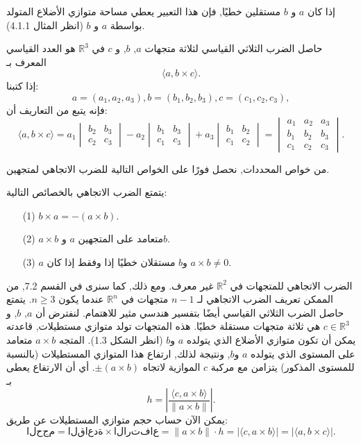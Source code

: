 إذا كان \( a \) و \( b \) مستقلين خطيًا, فإن هذا التعبير يعطي مساحة متوازي الأضلاع المتولد بواسطة \( a \) و \( b \) (انظر المثال 4.1.1).
\begin{definition}
حاصل الضرب الثلاثي القياسي لثلاثة متجهات \( a \), \( b \), و \( c \) في \( \mathbb{R}^3 \) هو العدد القياسي المعرف بـ
\[ \langle a, b \times c \rangle. \]
إذا كتبنا:
\[ a = (a_1, a_2, a_3), b = (b_1, b_2, b_3), c = (c_1, c_2, c_3), \]
فإنه يتبع من التعاريف أن:
\[ \langle a, b \times c \rangle = a_1 \begin{vmatrix} b_2 & b_3 \\ c_2 & c_3 \end{vmatrix} - a_2 \begin{vmatrix} b_1 & b_3 \\ c_1 & c_3 \end{vmatrix} + a_3 \begin{vmatrix} b_1 & b_2 \\ c_1 & c_2 \end{vmatrix} = \begin{vmatrix} a_1 & a_2 & a_3 \\ b_1 & b_2 & b_3 \\ c_1 & c_2 & c_3 \end{vmatrix}. \]
\end{definition}
من خواص المحددات, نحصل فورًا على الخواص التالية للضرب الاتجاهي لمتجهين.

\begin{theoreme}
يتمتع الضرب الاتجاهي بالخصائص التالية:
\begin{itemize}
    \item [(1)] \( b \times a = - (a \times b) \).
    \item [(2)] \( a \times b \) متعامد على المتجهين \( a \) و\( b \).
    \item [(3)] \( a \) و\( b \) مستقلان خطيًا إذا وفقط إذا كان \( a \times b \neq 0 \).
\end{itemize}
\end{theoreme}

الضرب الاتجاهي للمتجهات في \( \mathbb{R}^2 \) غير معرف. ومع ذلك, كما سنرى في القسم 7.2, من الممكن تعريف الضرب الاتجاهي لـ \( n - 1 \) متجهات في \( \mathbb{R}^n \) عندما يكون \( n \geq 3 \).
يتمتع حاصل الضرب الثلاثي القياسي أيضًا بتفسير هندسي مثير للاهتمام. لنفترض أن \( a \), \( b \), و\( c \in \mathbb{R}^3 \) هي ثلاثة متجهات مستقلة خطيًا. هذه المتجهات تولد متوازي مستطيلات, قاعدته يمكن أن تكون متوازي الأضلاع الذي يتولده \( a \) و\( b \) (انظر الشكل 1.3). المتجه \( a \times b \) متعامد على المستوى الذي يتولده \( a \) و\( b \), ونتيجة لذلك, ارتفاع هذا المتوازي المستطيلات (بالنسبة للمستوى المذكور) يتزامن مع مركبة \( c \) الموازية لاتجاه \( \pm (a \times b) \). أي أن الارتفاع يعطى بـ
\[ h = \left| \frac{\langle c, a \times b \rangle}{\|a \times b\|} \right|. \]
يمكن الآن حساب حجم متوازي المستطيلات عن طريق:
\[ الحجم = القاعدة \times الارتفاع = \|a \times b\| \cdot h = |\langle c, a \times b \rangle| = |\langle a, b \times c \rangle|. \]


